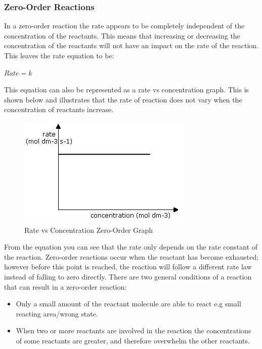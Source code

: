 \subsubsection{Zero-Order Reactions}

In a zero-order reaction the rate appears to be completely independent of the concentration of the reactants. This means that increasing or decreasing the concentration of the reactants will not have an impact on the rate of the reaction. This leaves the rate equation to be:

$Rate = k$

This equation can also be represented as a rate vs concentration graph. This is shown below and illustrates that the rate of reaction does not vary when the concentration of reactants increase.

\begin{figure}[H]
    \includegraphics[width=\textwidth]{./Planning/Images/ZeroOrder.jpg}
    \caption{ Rate vs Concentration Zero-Order Graph} \label{fig:Zero Order Graph}
\end{figure}


From the equation you can see that the rate only depends on the rate constant of the reaction. Zero-order reactions occur when the reactant has become exhausted; however before this point is reached, the reaction will follow a different rate law instead of falling to zero directly. There are two general conditions of a reaction that can result in a zero-order reaction:

\begin{itemize}
\item Only a small amount of the reactant molecule are able to react e.g small reacting area/wrong state.
\item When two or more reactants are involved in the reaction the concentrations of some reactants are greater, and therefore overwhelm the other reactants.
\end{itemize}

